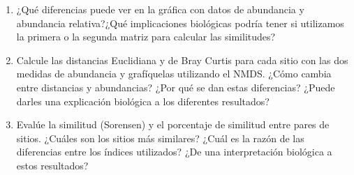 \documentclass[
]{article}
\begin{document}
\begin{enumerate}
\def\labelenumi{\alph{enumi}.}
\item
  ¿Qué diferencias puede ver en la gráfica con datos de abundancia y abundancia relativa?¿Qué implicaciones biológicas podría tener si utilizamos la primera o la segunda matriz para calcular las similitudes?
\item
  Calcule las distancias Euclidiana y de Bray Curtis para cada sitio con las dos medidas de abundancia y grafíquelas utilizando el NMDS. ¿Cómo cambia entre distancias y abundancias? ¿Por qué se dan estas diferencias? ¿Puede darles una explicación biológica a los diferentes resultados?
\item
  Evalúe la similitud (Sorensen) y el porcentaje de similitud entre pares de sitios. ¿Cuáles son los sitios más similares? ¿Cuál es la razón de las diferencias entre los índices utilizados? ¿De una interpretación biológica a estos resultados?
\end{enumerate}
\end{document}
